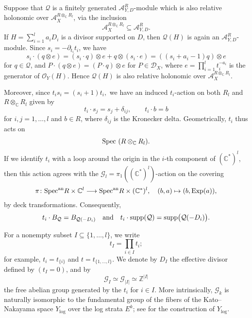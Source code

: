 \documentclass{amsart}
\theoremstyle{plain}
\numberwithin{theorem}{section}
\theoremstyle{definition}
\theoremstyle{remark}
\theoremstyle{definition}
\newcommand{\C}{\mathbb{C}} %
\newcommand{\Z}{\mathbb{Z}}
\newcommand{\cO}{\mathscr{O}}
\newcommand{\cQ}{\mathcal{Q}}
\newcommand{\sA}{\mathscr{A}}
\newcommand{\sG}{\mathscr{G}}
\newcommand{\shD}{\mathscr{D}}
\newcommand{\Spec}{\textup{Spec }}
\newcommand{\Specan}{\textup{Spec}^{\textup{an}}}
\newcommand{\supp}{\textup{supp}}
\begin{document}
Suppose that $\cQ$ is a finitely generated $\sA^R_{Y,D}$-module which is also relative holonomic over $\sA_X^{R\otimes_\C R_l}$, via the inclusion
\[
\sA_X^{R\otimes_\C R_l}\subseteq \sA_{Y,D}^R.
\]
If
$H=\sum_{i=1}^l a_iD_i$
is a divisor supported on $D$, then $\cQ(H)$ is again an $\sA^R_{Y,D}$-module. Since $s_i=-\partial_{t_i}t_i$, we have
\[
s_i\cdot(q\otimes e)
=
(s_i\cdot q)\otimes e+q\otimes(s_i\cdot e)
=
((s_i+a_i-1)q)\otimes e
\]
for $q\in \cQ$, and
$P\cdot(q\otimes e)=(P\cdot q)\otimes e$
for $P\in \shD_X$, where
$e=\prod_{i=1}^l t_i^{-a_i}$
is the generator of $\cO_Y(H)$. Hence $\cQ(H)$ is also relative holonomic over $\sA_X^{R\otimes_\C R_l}$.

Moreover, since
$t_is_i=(s_i+1)t_i,$
we have an induced $t_i$-action on both $R_l$ and $R\otimes_\C R_l$ given by
\[
t_i\cdot s_j=s_j+\delta_{ij},
\qquad
t_i\cdot b=b
\]
for $i,j=1,\dots,l$ and $b\in R$, where $\delta_{ij}$ is the Kronecker delta. Geometrically, $t_i$ thus acts on
\[
\Spec(R\otimes_\C R_l).
\]
If we identify $t_i$ with a loop around the origin in the $i$-th component of $(\C^*)^l$, then this action agrees with the $\sG_l=\pi_1((\C^*)^l)$-action on the covering
\[
\pi\colon
\Specan R\times \C^l
\longrightarrow
\Specan R\times(\C^*)^l,
\quad
(b,a)\mapsto (b,\textup{Exp}(a)),
\]
by deck transformations. Consequently,
\begin{equation}\label{eq:actionBsupp}
t_i\cdot B_\cQ=B_{\cQ(-D_i)}
\quad \textup{and} \quad
t_i\cdot\supp(\cQ)=\supp\big(\cQ(-D_i)\big).
\end{equation}

For a nonempty subset $I\subseteq\{1,\dots,l\}$, we write
\[
t_I=\prod_{i\in I}t_i;
\]
for example,
$t_i=t_{\{i\}}$ and 
$t=t_{\{1,\dots,l\}}.$
We denote by $D_I$ the effective divisor defined by $(t_I=0)$, and by
\[
\sG_I\simeq \sG_{|I|}\simeq \Z^{|I|}
\]
the free abelian group generated by the $t_i$ for $i\in I$. More intrinsically, $\sG_k$ is naturally isomorphic to the fundamental group of the fibers of the Kato--Nakayama space $Y_{\log}$ over the log strata $E^k$; see \cite[V.1]{Ogusbook} for the construction of $Y_{\log}$.
\end{document}
